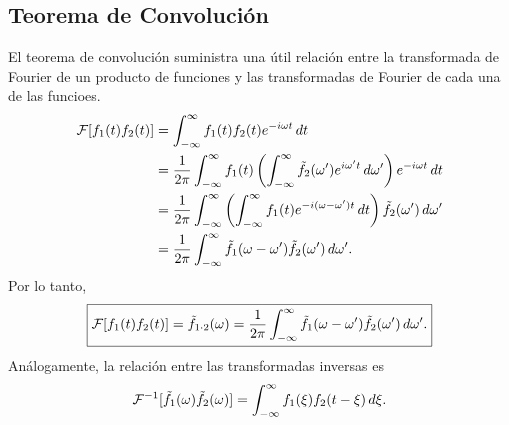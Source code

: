 \subsection{Teorema de Convolución}
El teorema de convolución suministra una útil relación entre la transformada de Fourier de un producto de funciones y las transformadas de Fourier de cada una de las funcioes.
\begin{align}
{\cal F}[f_1(t)f_2(t)]
 &=\int_{-\infty}^\infty f_1(t)f_2(t) e^{-i\omega t}\,dt \\
 &=\frac{1}{2\pi}\int_{-\infty}^\infty f_1(t) \left(\int_{-\infty}^\infty\tilde{f}_2(\omega')
 e^{i\omega' t}\,d\omega'\right)e^{-i\omega t}\,dt \\
 &=\frac{1}{2\pi}\int_{-\infty}^\infty\left(\int_{-\infty}^\infty f_1(t) 
 e^{-i(\omega-\omega')t}\,dt\right)\tilde{f}_2(\omega')\,d\omega' \\
 &=\frac{1}{2\pi} \int_{-\infty}^\infty\tilde{f}_1(\omega-\omega')\tilde{f}_2(\omega')\,d\omega'.
\end{align}
Por lo tanto, 
\begin{equation}\label{TeocovTF}
\boxed{{\cal F}[f_1(t)f_2(t)] = \tilde{f}_{1\cdot 2}(\omega)=\frac{1}{2\pi} \int_{-\infty}^\infty\tilde{f}_1(\omega-\omega')\tilde{f}_2(\omega')\,d\omega' .
 } 
\end{equation}   
Análogamente, la relación entre las transformadas inversas es
\begin{equation}
{\cal F}^{-1}[\tilde{f}_1(\omega)\tilde{f}_2(\omega)]
=\int_{-\infty}^\infty f_1(\xi)f_2(t-\xi)\,d\xi .	
\end{equation}



